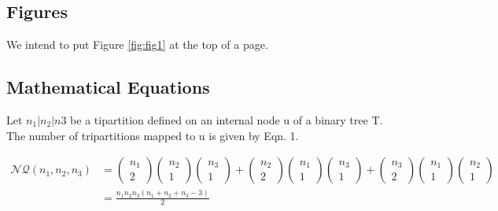 \documentclass[14pt, a4paper]{article} %
\begin{document}
    \subsection{Figures}
    We intend to put Figure \ref{fig:fig1} at the top of a page.
    
    \subsection{Mathematical Equations}
    Let $n_1|n_2|n3$ be a tipartition defined on an internal node u of a binary tree T. The number of tripartitions mapped to u is given by Eqn. 1.
    
    \begin{equation} \label{eq1}
        \begin{split}
        \mathcal{NQ}(n_1, n_2, n_3) & = 
            \begin{pmatrix}
                    n_1 \\
                    2
                \end{pmatrix}
                \begin{pmatrix}
                    n_2 \\
                    1
                \end{pmatrix}
                \begin{pmatrix}
                    n_3 \\
                    1
                \end{pmatrix}
                +
                \begin{pmatrix}
                    n_2 \\
                    2
                \end{pmatrix}
                \begin{pmatrix}
                    n_1 \\
                    1
                \end{pmatrix}
                \begin{pmatrix}
                    n_3 \\
                    1
                \end{pmatrix}
                +
                \begin{pmatrix}
                    n_3 \\
                    2
                \end{pmatrix}
                \begin{pmatrix}
                    n_1 \\
                    1
                \end{pmatrix}
                \begin{pmatrix}
                    n_2 \\
                    1
                \end{pmatrix} \\
        & = \frac{n_1 n_2 n_3 (n_1 + n_2 + n_3 - 3)}{2}
        \end{split}
    \end{equation}
\end{document}
